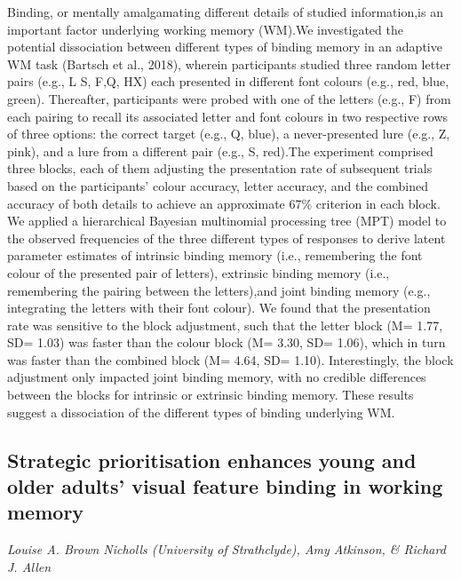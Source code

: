\documentclass[
  12pt,
]{book}
\begin{document}
Binding, or mentally amalgamating different details of studied information,is an important factor underlying working memory (WM).We investigated the potential dissociation between different types of binding memory in an adaptive WM task (Bartsch et al., 2018), wherein participants studied three random letter pairs (e.g., L S, F‚Q, HX) each presented in different font colours (e.g., red, blue, green). Thereafter, participants were probed with one of the letters (e.g., F) from each pairing to recall its associated letter and font colours in two respective rows of three options: the correct target (e.g., Q, blue), a never-presented lure (e.g., Z, pink), and a lure from a different pair (e.g., S, red).The experiment comprised three blocks, each of them adjusting the presentation rate of subsequent trials based on the participants' colour accuracy, letter accuracy, and the combined accuracy of both details to achieve an approximate 67\% criterion in each block. We applied a hierarchical Bayesian multinomial processing tree (MPT) model to the observed frequencies of the three different types of responses to derive latent parameter estimates of intrinsic binding memory (i.e., remembering the font colour of the presented pair of letters), extrinsic binding memory (i.e., remembering the pairing between the letters),and joint binding memory (e.g., integrating the letters with their font colour). We found that the presentation rate was sensitive to the block adjustment, such that the letter block (M= 1.77, SD= 1.03) was faster than the colour block (M= 3.30, SD= 1.06), which in turn was faster than the combined block (M= 4.64, SD= 1.10). Interestingly, the block adjustment only impacted joint binding memory, with no credible differences between the blocks for intrinsic or extrinsic binding memory. These results suggest a dissociation of the different types of binding underlying WM.

\hypertarget{strategic-prioritisation-enhances-young-and-older-adults-visual-feature-binding-in-working-memory}{%
\subsection{Strategic prioritisation enhances young and older adults' visual feature binding in working memory}\label{strategic-prioritisation-enhances-young-and-older-adults-visual-feature-binding-in-working-memory}}

\emph{Louise A. Brown Nicholls (University of Strathclyde), Amy Atkinson, \& Richard J. Allen}
\end{document}
